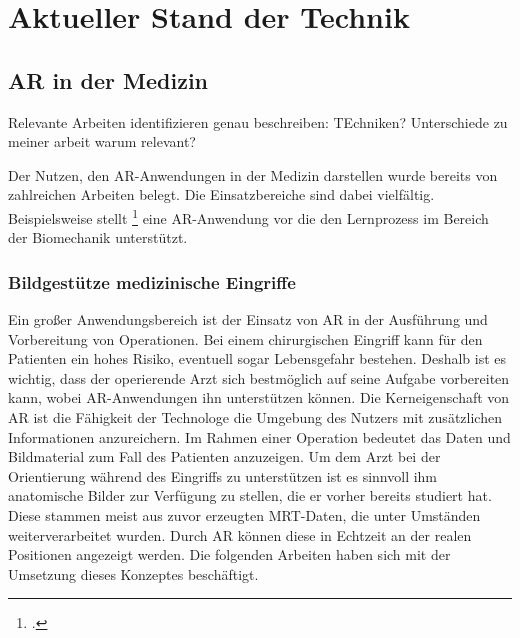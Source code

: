 
\chapter{Aktueller Stand der Technik}
\label{grundlagen}
\section{AR in der Medizin}												 %
 Relevante Arbeiten identifizieren
 genau beschreiben: TEchniken? Unterschiede zu meiner arbeit warum relevant?
 
Der Nutzen, den AR-Anwendungen in der Medizin darstellen wurde bereits von zahlreichen Arbeiten belegt. Die Einsatzbereiche sind dabei vielfältig.
Beispielsweise stellt \footcite{Voinea16} eine AR-Anwendung vor die den Lernprozess im Bereich der Biomechanik unterstützt.

\subsection{Bildgestütze medizinische Eingriffe}

Ein großer Anwendungsbereich ist der Einsatz von AR in der Ausführung und Vorbereitung von Operationen. Bei einem chirurgischen Eingriff kann für den Patienten ein hohes Risiko, eventuell sogar Lebensgefahr bestehen. Deshalb ist es wichtig, dass der operierende Arzt sich bestmöglich auf seine Aufgabe vorbereiten kann, wobei AR-Anwendungen ihn unterstützen können.
Die Kerneigenschaft von AR ist die Fähigkeit der Technologe die Umgebung des Nutzers mit zusätzlichen Informationen anzureichern. Im Rahmen einer Operation bedeutet das Daten und Bildmaterial zum Fall des Patienten anzuzeigen. Um dem Arzt bei der Orientierung während des Eingriffs zu unterstützen ist es sinnvoll ihm anatomische Bilder zur Verfügung zu stellen, die er vorher bereits studiert hat. Diese stammen meist aus zuvor erzeugten MRT-Daten, die unter Umständen weiterverarbeitet wurden. Durch AR können diese in Echtzeit an der realen Positionen angezeigt werden. 
Die folgenden Arbeiten haben sich mit der Umsetzung dieses Konzeptes beschäftigt.


